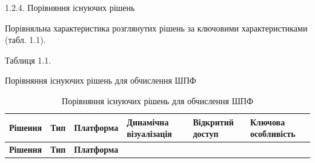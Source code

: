 1.2.4. Порівняння існуючих рішень

Порівняльна характеристика розглянутих рішень за ключовими
характеристиками (табл. 1.1).

Таблиця 1.1.

Порівняння існуючих рішень для обчислення ШПФ

\begin{longtable}[]{@{}
  >{\centering\arraybackslash}p{}
  >{\centering\arraybackslash}p{}
  >{\centering\arraybackslash}p{}
  >{\centering\arraybackslash}p{}
  >{\centering\arraybackslash}p{}
  >{\centering\arraybackslash}p{}@{}}
\caption[Порівняння існуючих рішень для обчислення ШПФ]{Порівняння
існуючих рішень для обчислення ШПФ}\tabularnewline
\toprule\noalign{}
\begin{minipage}[b]{\linewidth}\centering
\textbf{Рішення}
\end{minipage} & \begin{minipage}[b]{\linewidth}\centering
\textbf{Тип}
\end{minipage} & \begin{minipage}[b]{\linewidth}\centering
\textbf{Платформа}
\end{minipage} & \begin{minipage}[b]{\linewidth}\centering
\textbf{Динамічна візуалізація}
\end{minipage} & \begin{minipage}[b]{\linewidth}\centering
\textbf{Відкритий доступ}
\end{minipage} & \begin{minipage}[b]{\linewidth}\centering
\textbf{Ключова особливість}
\end{minipage} \\
\midrule\noalign{}
\endfirsthead
\toprule\noalign{}
\begin{minipage}[b]{\linewidth}\centering
\textbf{Рішення}
\end{minipage} & \begin{minipage}[b]{\linewidth}\centering
\textbf{Тип}
\end{minipage} & \begin{minipage}[b]{\linewidth}\centering
\textbf{Платформа}
\end{minipage} & \begin{minipage}[b]{\linewidth}\centering

\end{minipage}
\end{longtable}
